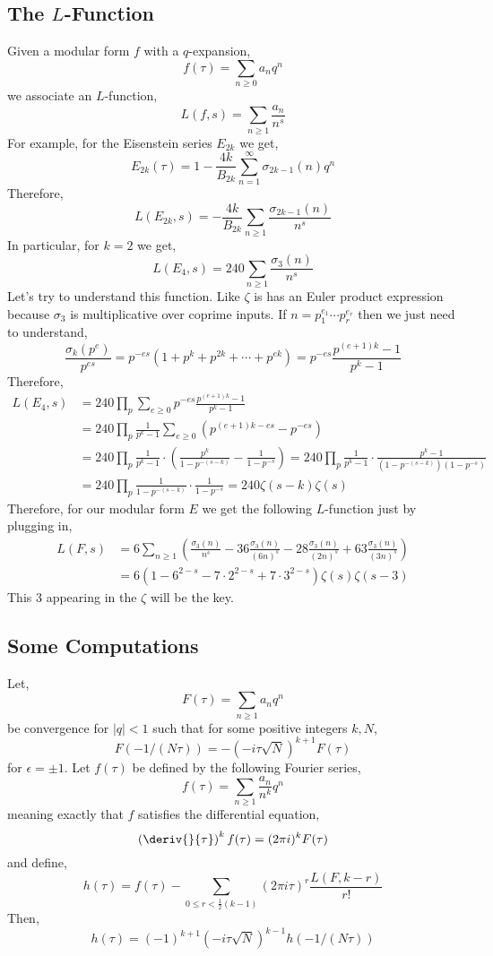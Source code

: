 \documentclass[12pt]{article}
\begin{document}
\subsection{The $L$-Function}

Given a modular form $f$ with a $q$-expansion,
\[ f(\tau) = \sum_{n \ge 0} a_n q^n \]
we associate an $L$-function,
\[ L(f, s) = \sum_{n \ge 1} \frac{a_n}{n^s} \]
For example, for the Eisenstein series $E_{2k}$ we get,
\[ E_{2k}(\tau) = 1 - \frac{4 k}{B_{2k}} \sum_{n = 1}^\infty \sigma_{2k - 1}(n) q^n \]
Therefore, 
\[ L(E_{2k}, s) = - \frac{4k}{B_{2k}} \sum_{n \ge 1} \frac{\sigma_{2k-1}(n)}{n^s} \]
In particular, for $k = 2$ we get,
\[ L(E_4, s) = 240 \sum_{n \ge 1} \frac{\sigma_3(n)}{n^s} \]
Let's try to understand this function. Like $\zeta$ is has an Euler product expression because $\sigma_3$ is multiplicative over coprime inputs. If $n = p_1^{e_1} \cdots p_r^{e_r}$ then we just need to understand,
\[ \frac{\sigma_k(p^e)}{p^{es}} = p^{-es} \left(1 + p^k + p^{2k} + \cdots + p^{ek} \right) = p^{-es} \frac{p^{(e + 1) k} - 1}{p^k - 1} \]
Therefore, 
\begin{align*}
L(E_4, s) & = 240 \prod_{p} \sum_{e \ge 0} p^{-es} \frac{p^{(e + 1) k} - 1}{p^k - 1} 
\\
& = 240 \prod_{p} \frac{1}{p^k - 1} \sum_{e \ge 0} (p^{(e+1)k - es} - p^{-es} ) 
\\
& = 240 \prod_{p} \frac{1}{p^k - 1} \cdot \left( \frac{p^k}{1 - p^{-(s-k)}} - \frac{1}{1 - p^{-s}} \right) = 240 \prod_p \frac{1}{p^k - 1} \cdot \frac{p^k - 1}{(1 - p^{-(s-k)})(1 - p^{-s})}
\\
& = 240 \prod_{p} \frac{1}{1 - p^{-(s-k)}} \cdot \frac{1}{1 - p^{-s}} = 240 \zeta(s-k) \zeta(s) 
\end{align*}
Therefore, for our modular form $E$ we get the following $L$-function just by plugging in,
\begin{align*}
L(F, s) & = 6 \sum_{n \ge 1} \left( \frac{\sigma_3(n)}{n^s} - 36 \frac{\sigma_3(n)}{(6 n)^s} - 28 \frac{\sigma_3(n)}{(2n)^s} + 63 \frac{\sigma_3(n)}{(3 n)^s} \right)
\\
& = 6(1 - 6^{2-s} - 7 \cdot 2^{2-s} + 7 \cdot 3^{2-s}) \zeta(s) \zeta(s - 3)
\end{align*}
This $3$ appearing in the $\zeta$ will be the key.

\subsection{Some Computations}

\begin{prop}
Let,
\[ F(\tau) = \sum_{n \ge 1} a_n q^n \]
be convergence for $|q| < 1$ such that for some positive integers $k,N$,
\[ F(-1/(N \tau)) = - (-i \tau \sqrt{N})^{k+1} F(\tau) \]
for $\epsilon = \pm 1$.
Let $f(\tau)$ be defined by the following Fourier series,
\[ f(\tau) = \sum_{n \ge 1} \frac{a_n}{n^{k}} q^n \]
meaning exactly that $f$ satisfies the differential equation,
\[ \left( \deriv{}{\tau} \right)^{k} f(\tau) = (2 \pi i)^{k} F(\tau) \]
and define,
\[ h(\tau) = f(\tau) - \sum_{0 \le r < \tfrac{1}{2}(k-1)} (2\pi i \tau)^r \frac{L(F, k-r)}{r!} \]
Then,
\[ h(\tau) = (-1)^{k+1} (-i \tau \sqrt{N})^{k-1} h(-1/(N \tau)) \]
\end{prop}
\end{document}
